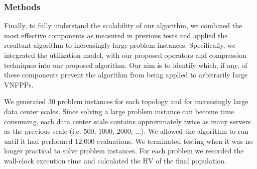 \subsubsection{Methods}
Finally, to fully understand the scalability of our algorithm, we combined the most effective components as measured in previous tests and applied the resultant algorithm to increasingly large problem instances. Specifically, we integrated the utilization model, with our proposed operators and compression techniques into our proposed algorithm. Our aim is to identify which, if any, of these components prevent the algorithm from being applied to arbitrarily large VNFPPs.

We generated 30 problem instances for each topology and for increasingly large data center scales. Since solving a large problem instance can become time consuming, each data center scale contains approximately twice as many servers as the previous scale (i.e. $500$, $1000$, $2000$, $\dots$). We allowed the algorithm to run until it had performed 12,000 evaluations. We terminated testing when it was no longer practical to solve problem instances. For each problem we recorded the wall-clock execution time and calculated the HV of the final population.


